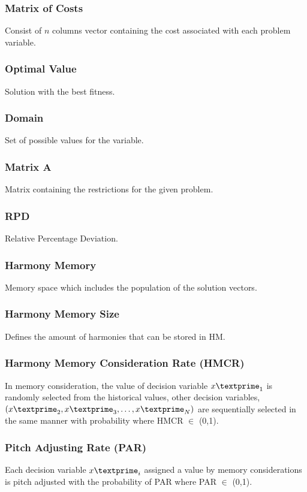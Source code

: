\subsubsection{Matrix of Costs} 
Consist of $n$ columns vector containing the cost associated with each problem variable.

\subsubsection{Optimal Value} 
Solution with the best fitness.

\subsubsection{Domain} 
Set of possible values for the variable.

\subsubsection{Matrix A} 
Matrix containing the restrictions for the given problem.

\subsubsection{RPD} 
Relative Percentage Deviation.

\subsubsection{Harmony Memory} 
Memory space which includes the population of the solution vectors.

\subsubsection{Harmony Memory Size} 
Defines the amount of harmonies that can be stored in HM.

\subsubsection{Harmony Memory Consideration Rate (HMCR)} 
In memory consideration, the value of decision variable ${x\textprime}_1$ is randomly selected from the historical values, other decision variables, $({x\textprime}_2, {x\textprime}_3,\dots,{x\textprime}_N)$ are sequentially selected in the same manner with probability where HMCR $\in$ (0,1).

\subsubsection{Pitch Adjusting Rate (PAR)} 
Each decision variable ${x\textprime}_i$ assigned a value by memory considerations is pitch adjusted with the probability of PAR where PAR $\in$ (0,1).



